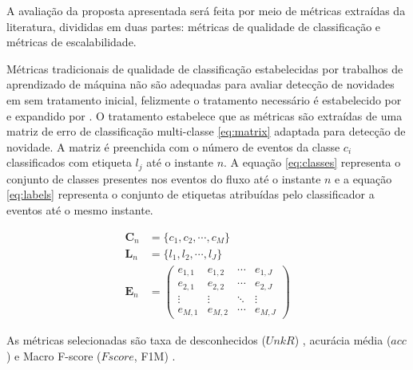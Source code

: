 A avaliação da proposta apresentada será feita por meio de métricas extraídas da
literatura, divididas em duas partes: métricas de qualidade de classificação
e métricas de escalabilidade.

Métricas tradicionais de qualidade de classificação estabelecidas por trabalhos
de aprendizado de máquina não são adequadas para avaliar detecção de novidades em
\streams sem tratamento inicial, felizmente o tratamento necessário é
estabelecido por  e expandido por
.
O tratamento estabelece que as métricas são extraídas de uma matriz de erro de
classificação multi-classe \ref{eq:matrix} adaptada para detecção de novidade.
A matriz é preenchida com o número de eventos da classe $c_i$ classificados com
etiqueta $l_j$ até o instante $n$.
A equação \ref{eq:classes} representa o conjunto de classes presentes nos eventos
do fluxo até o instante $n$ e a equação \ref{eq:labels} representa o conjunto
de etiquetas atribuídas pelo classificador a eventos até o mesmo instante.

\begin{align}
  \mathbf{C}_n &= \{ c_1, c_2, \cdots, c_M \}  \label{eq:classes} \\
  \mathbf{L}_n &= \{ l_1, l_2, \cdots, l_J \}  \label{eq:labels} \\
  \mathbf{E}_n &= \begin{pmatrix}
    e_{1,1} & e_{1,2} & \cdots & e_{1,J} \\
    e_{2,1} & e_{2,2} & \cdots & e_{2,J} \\
    \vdots  & \vdots  & \ddots & \vdots  \\
    e_{M,1} & e_{M,2} & \cdots & e_{M,J} 
  \end{pmatrix}  \label{eq:matrix}
\end{align}


As métricas selecionadas são taxa de desconhecidos ($UnkR$) \cite{Faria2013},
acurácia média ($acc$) e Macro F-score ($Fscore$, F1M)
\cite{Sokolova2009,DaSilva2018thesis}.



